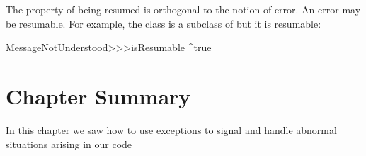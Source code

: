 \documentclass[a4paper,10pt,twoside]{book}
\begin{document}
The property of being resumed is orthogonal to the notion of error. An error may be resumable. For example, the class  is a subclass of  but it is resumable:

\begin{code}{}
MessageNotUnderstood>>>isResumable 
     ^true
\end{code}


\section{Chapter Summary}

In this chapter we saw how to use exceptions to signal and handle abnormal situations arising in our code
\end{document}
